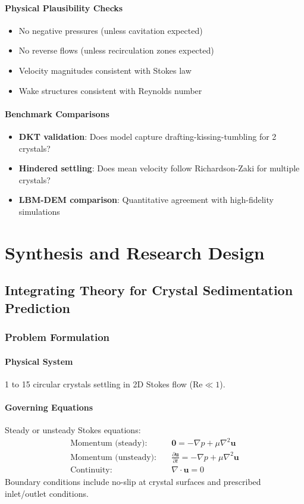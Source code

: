\subsection{Physical Plausibility Checks}
\begin{itemize}
    \item No negative pressures (unless cavitation expected)
    \item No reverse flows (unless recirculation zones expected)
    \item Velocity magnitudes consistent with Stokes law
    \item Wake structures consistent with Reynolds number
\end{itemize}

\subsection{Benchmark Comparisons}
\begin{itemize}
    \item \textbf{DKT validation}: Does model capture drafting-kissing-tumbling for 2 crystals?
    \item \textbf{Hindered settling}: Does mean velocity follow Richardson-Zaki for multiple crystals?
    \item \textbf{LBM-DEM comparison}: Quantitative agreement with high-fidelity simulations
\end{itemize}

\part{Synthesis and Research Design}

\chapter{Integrating Theory for Crystal Sedimentation Prediction}

\section{Problem Formulation}

\subsection{Physical System}
1 to 15 circular crystals settling in 2D Stokes flow ($\text{Re} \ll 1$).

\subsection{Governing Equations}
Steady or unsteady Stokes equations:
\begin{align}
\text{Momentum (steady):} \quad & \mathbf{0} = -\nabla p + \mu \nabla^2 \mathbf{u} \\
\text{Momentum (unsteady):} \quad & \frac{\partial \mathbf{u}}{\partial t} = -\nabla p + \mu \nabla^2 \mathbf{u} \\
\text{Continuity:} \quad & \nabla \cdot \mathbf{u} = 0
\end{align}
Boundary conditions include no-slip at crystal surfaces and prescribed inlet/outlet conditions.

